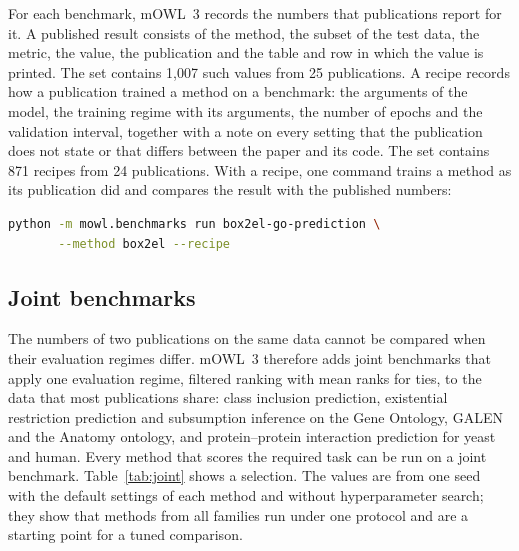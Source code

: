 \documentclass[runningheads]{llncs}
\begin{document}
For each benchmark, mOWL~3 records the numbers that publications report for it. A
published result consists of the method, the subset of the test data, the metric, the
value, the publication and the table and row in which the value is printed. The set
contains 1,007 such values from 25 publications. A recipe records how a publication
trained a method on a benchmark: the arguments of the model, the training regime with its
arguments, the number of epochs and the validation interval, together with a note on
every setting that the publication does not state or that differs between the paper and
its code. The set contains 871 recipes from 24 publications. With a recipe, one command
trains a method as its publication did and compares the result with the published
numbers:

\begin{lstlisting}[language=bash]
python -m mowl.benchmarks run box2el-go-prediction \
       --method box2el --recipe
\end{lstlisting}

\subsection{Joint benchmarks}

The numbers of two publications on the same data cannot be compared when their
evaluation regimes differ. mOWL~3 therefore adds joint benchmarks that apply one
evaluation regime, filtered ranking with mean ranks for ties, to the data that most
publications share: class inclusion prediction, existential restriction prediction and
subsumption inference on the Gene Ontology, GALEN and the Anatomy ontology, and
protein--protein interaction prediction for yeast and human. Every method that scores
the required task can be run on a joint benchmark. Table~\ref{tab:joint} shows a
selection. The values are from one seed with the default settings of each method and
without hyperparameter search; they show that methods from all families run under one
protocol and are a starting point for a tuned comparison.
\end{document}
